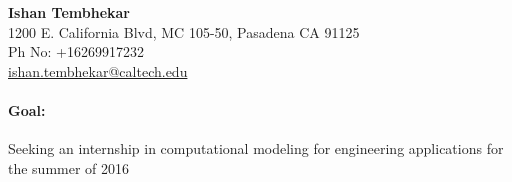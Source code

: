 \documentclass[10pt,fleqn]{article}
\begin{document}


\begin{center}
\LARGE \textbf{Ishan Tembhekar} \small \\[0.16cm]
1200 E. California Blvd, MC 105-50, Pasadena CA 91125 \\
Ph No: +16269917232 \\
\href{mailto:ishan.tembhekar@caltech.edu}{ishan.tembhekar@caltech.edu} \hfill
\end{center}
\paragraph*{Goal:} Seeking an internship in computational modeling for engineering applications for the summer of 2016  
\end{document}
